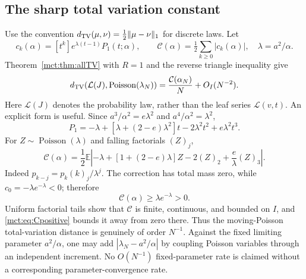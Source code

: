 \documentclass[11pt]{article}
\theoremstyle{definition}
\newcommand{\Exp}{\mathbb E}
\begin{document}
\subsection{The sharp total variation constant}
Use the convention $d_{\rm TV}(\mu,\nu)=\frac12\|\mu-\nu\|_1$ for discrete laws. Let
\[
 c_k(\alpha)=[t^k]e^{\lambda(t-1)}P_1(t;\alpha),\qquad
 \mathcal C(\alpha)=\tfrac12\sum_{k\ge0}|c_k(\alpha)|,\quad \lambda=a^2/\alpha.
\]
Theorem~\ref{mct:thm:allTV} with $R=1$ and the reverse triangle inequality give
\begin{equation}\label{mct:eq:sharpTV}
 d_{\rm TV}(\mathcal L(J),\operatorname{Poisson}(\lambda_N))
 =\frac{\mathcal C(\alpha_N)}N+O_I(N^{-2}).
\end{equation}
Here $\mathcal L(J)$ denotes the probability law, rather than the leaf series $\mathcal L(v,t)$.
An explicit form is useful. Since $a^3/\alpha^2=e\lambda^2$ and $a^4/\alpha^2=\lambda^2$,
\[
 P_1=-\lambda+[\lambda+(2-e)\lambda^2]t-2\lambda^2t^2+e\lambda^2t^3.
\]
For $Z\sim\operatorname{Poisson}(\lambda)$ and falling factorials $(Z)_j$,
\begin{equation}\label{mct:eq:TVconstant}
 \mathcal C(\alpha)=\frac12\Exp\left|
 -\lambda+[1+(2-e)\lambda]Z-2(Z)_2+\frac e\lambda(Z)_3
 \right|.
\end{equation}
Indeed $p_{k-j}=p_k(k)_j/\lambda^j$. The correction has total mass zero, while $c_0=-\lambda e^{-\lambda}<0$; therefore
\begin{equation}\label{mct:eq:Cpositive}
 \mathcal C(\alpha)\ge\lambda e^{-\lambda}>0.
\end{equation}
Uniform factorial tails show that $\mathcal C$ is finite, continuous, and bounded on $I$, and \eqref{mct:eq:Cpositive} bounds it away from zero there. Thus the moving-Poisson total-variation distance is genuinely of order $N^{-1}$. Against the fixed limiting parameter $a^2/\alpha$, one may add $|\lambda_N-a^2/\alpha|$ by coupling Poisson variables through an independent increment. No $O(N^{-1})$ fixed-parameter rate is claimed without a corresponding parameter-convergence rate.
\end{document}
